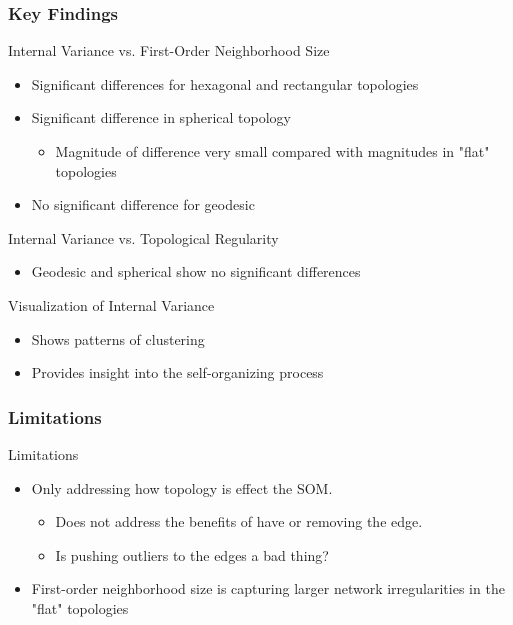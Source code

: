 \documentclass[nototal,handout]{beamer}
\begin{document}
\begin{frame}
	\frametitle{Key Findings}
 
\begin{block}{Internal Variance vs. First-Order Neighborhood Size}
 \begin{itemize}
 \item  Significant differences for hexagonal and rectangular topologies
 \item  Significant difference in spherical topology
 \begin{itemize}
 \item  Magnitude of difference very small compared with magnitudes in "flat" topologies
 \end{itemize}
 \item  No significant difference for geodesic
 \end{itemize}
 \end{block} 
\begin{block}{Internal Variance vs. Topological Regularity}
 \begin{itemize}
 \item  Geodesic and spherical show no significant differences
 \end{itemize}
 \end{block} 
\begin{block}{Visualization of Internal Variance}
 \begin{itemize}
 \item  Shows patterns of clustering
 \item  Provides insight into the self-organizing process
 \end{itemize}
 \end{block} \end{frame} 

\begin{frame}
	\frametitle{Limitations}
 
\begin{block}{Limitations}
 \begin{itemize}
 \item  Only addressing how topology is effect the SOM.
 \begin{itemize}
 \item  Does not address the benefits of have or removing the edge.
 \item  Is pushing outliers to the edges a bad thing?
 \end{itemize}
 \item  First-order neighborhood size is capturing larger network irregularities in the "flat" topologies
 \end{itemize}
 \end{block} \end{frame} 
\end{document}
